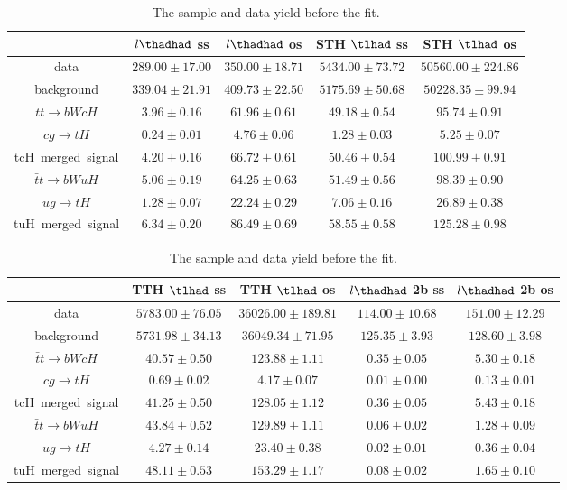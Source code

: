 \begin{table}
\caption{The sample and data yield before the fit.}
\centering
\begin{tabular}{|c|c|c|c|c|} \hline
 & $l\thadhad$ ss & $l\thadhad$ os & STH $\tlhad$ ss & STH $\tlhad$ os\\\hline
data & $289.00\pm17.00$ & $350.00\pm18.71$ & $5434.00\pm73.72$ & $50560.00\pm224.86$\\\hline
background & $339.04\pm21.91$ & $409.73\pm22.50$ & $5175.69\pm50.68$ & $50228.35\pm99.94$\\\hline
$\bar{t}t\to bWcH$ & $3.96\pm0.16$ & $61.96\pm0.61$ & $49.18\pm0.54$ & $95.74\pm0.91$\\\hline
$cg\to tH$ & $0.24\pm0.01$ & $4.76\pm0.06$ & $1.28\pm0.03$ & $5.25\pm0.07$\\\hline
tcH~merged~signal & $4.20\pm0.16$ & $66.72\pm0.61$ & $50.46\pm0.54$ & $100.99\pm0.91$\\\hline
$\bar{t}t\to bWuH$ & $5.06\pm0.19$ & $64.25\pm0.63$ & $51.49\pm0.56$ & $98.39\pm0.90$\\\hline
$ug\to tH$ & $1.28\pm0.07$ & $22.24\pm0.29$ & $7.06\pm0.16$ & $26.89\pm0.38$\\\hline
tuH~merged~signal & $6.34\pm0.20$ & $86.49\pm0.69$ & $58.55\pm0.58$ & $125.28\pm0.98$\\\hline
\end{tabular}
\begin{tabular}{|c|c|c|c|c|} \hline
 & TTH $\tlhad$ ss & TTH $\tlhad$ os & $l\thadhad$ 2b ss & $l\thadhad$ 2b os\\\hline
data & $5783.00\pm76.05$ & $36026.00\pm189.81$ & $114.00\pm10.68$ & $151.00\pm12.29$\\\hline
background & $5731.98\pm34.13$ & $36049.34\pm71.95$ & $125.35\pm3.93$ & $128.60\pm3.98$\\\hline
$\bar{t}t\to bWcH$ & $40.57\pm0.50$ & $123.88\pm1.11$ & $0.35\pm0.05$ & $5.30\pm0.18$\\\hline
$cg\to tH$ & $0.69\pm0.02$ & $4.17\pm0.07$ & $0.01\pm0.00$ & $0.13\pm0.01$\\\hline
tcH~merged~signal & $41.25\pm0.50$ & $128.05\pm1.12$ & $0.36\pm0.05$ & $5.43\pm0.18$\\\hline
$\bar{t}t\to bWuH$ & $43.84\pm0.52$ & $129.89\pm1.11$ & $0.06\pm0.02$ & $1.28\pm0.09$\\\hline
$ug\to tH$ & $4.27\pm0.14$ & $23.40\pm0.38$ & $0.02\pm0.01$ & $0.36\pm0.04$\\\hline
tuH~merged~signal & $48.11\pm0.53$ & $153.29\pm1.17$ & $0.08\pm0.02$ & $1.65\pm0.10$\\\hline

\end{tabular}
\end{table}
